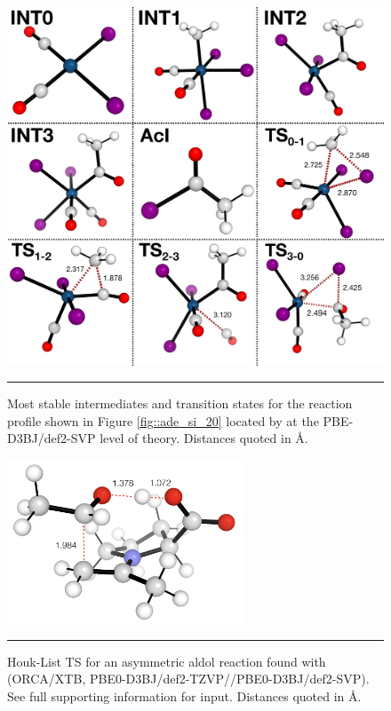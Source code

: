 \documentclass[../../main.tex]{subfiles}
\begin{document}
\begin{figure}[h!]
	\vspace{0.4cm}
	\centering
	\includegraphics[width=13cm]{5/autode/figs/figS22}
	\vspace{0.2cm}
	\hrule
	\caption{Most stable intermediates and transition states for the reaction profile shown in Figure \ref{fig::ade_si_20} located by \ade at the PBE-D3BJ/def2-SVP level of theory. Distances quoted in \AA.}
	\label{fig::ade_si_22}
\end{figure}
\fi



\begin{figure}[h!]
	\vspace{0.4cm}
	\centering
	\includegraphics[width=7cm]{5/autode/figs/figS23}
	\vspace{0.2cm}
	\hrule
	\caption{Houk-List TS for an asymmetric aldol reaction found with \ade (ORCA/XTB, PBE0-D3BJ/def2-TZVP//PBE0-D3BJ/def2-SVP). See full supporting information for input. Distances quoted in \AA.}
	\label{fig::ade_si_23}
\end{figure}
\end{document}
